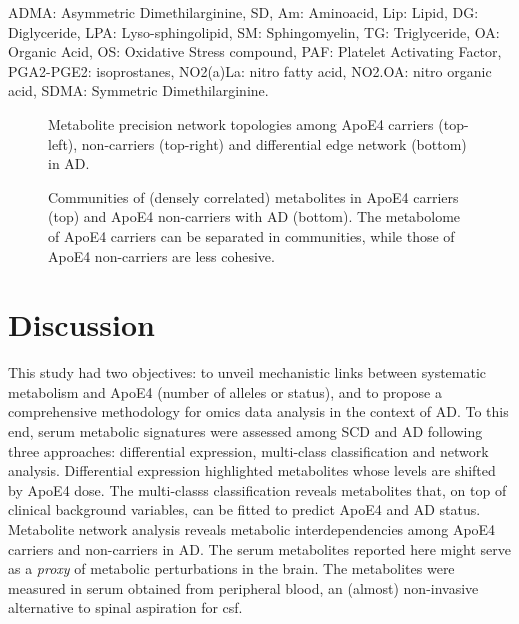 \documentclass{amsart}
\begin{document}
\begin{table}[H]
\begin{threeparttable}
\begin{tabular}{lclc}
  \end{tabular}
\begin{tablenotes}
\item[] ADMA: Asymmetric Dimethilarginine, SD, Am: Aminoacid, Lip: Lipid, DG: Diglyceride, LPA: Lyso-sphingolipid, SM: Sphingomyelin, TG: Triglyceride, OA: Organic Acid, OS: Oxidative Stress compound, PAF: Platelet Activating Factor, PGA2-PGE2: isoprostanes, NO2(a)La: nitro fatty acid, NO2.OA: nitro organic acid, SDMA: Symmetric Dimethilarginine. \end{tablenotes}
\end{threeparttable}
  \end{table} \clearpage
\begin{figure}[!h]
  \centerline{}
  \caption{\label{netAD} Metabolite precision network topologies among ApoE4 carriers (top-left), non-carriers (top-right) and differential edge network (bottom) in AD.}  
  \end{figure}
\begin{figure}
  
  \caption{\label{comms} Communities of (densely correlated) metabolites in ApoE4 carriers (top) and ApoE4 non-carriers with AD (bottom). The metabolome of ApoE4 carriers can be separated in communities, while those of ApoE4 non-carriers are less cohesive.}
\end{figure}

\clearpage
\section{Discussion} \label{discuss}
This study had two objectives: to unveil mechanistic links between systematic metabolism and ApoE4 (number of alleles or status), and to propose a comprehensive methodology for omics data analysis in the context of AD. To this end, serum metabolic signatures were assessed among SCD and AD following three approaches: differential expression, multi-class classification and network analysis. Differential expression highlighted metabolites whose levels are shifted by ApoE4 dose. The multi-classs classification reveals metabolites that, on top of clinical background variables, can be fitted to predict ApoE4 and AD status. Metabolite network analysis reveals metabolic interdependencies among ApoE4 carriers and non-carriers in AD. The serum metabolites reported here might serve as a \textit{proxy} of metabolic perturbations in the brain. The metabolites were measured in serum obtained from peripheral blood, an (almost) non-invasive alternative to spinal aspiration for \acrshort{csf}.
\end{document}
